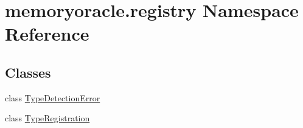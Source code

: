 \hypertarget{namespacememoryoracle_1_1registry}{}\section{memoryoracle.\+registry Namespace Reference}
\label{namespacememoryoracle_1_1registry}
\subsection*{Classes}
\begin{DoxyCompactItemize}
\item 
class \hyperlink{classmemoryoracle_1_1registry_1_1TypeDetectionError}{Type\+Detection\+Error}
\item 
class \hyperlink{classmemoryoracle_1_1registry_1_1TypeRegistration}{Type\+Registration}
\end{DoxyCompactItemize}
